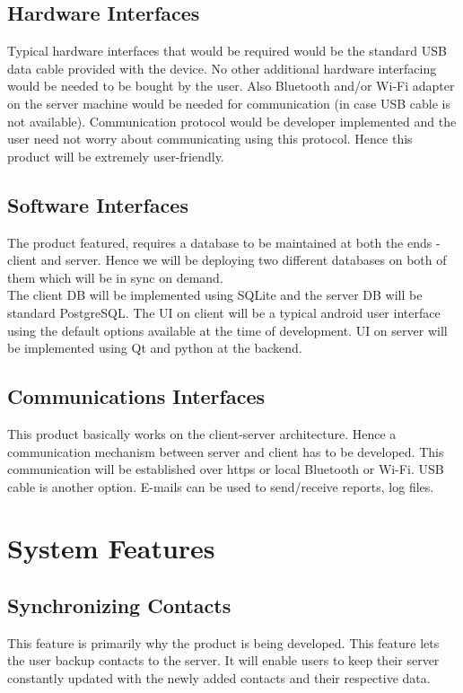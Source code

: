 \subsection{Hardware Interfaces}
\hspace*{0.82cm}Typical hardware interfaces that would be required would be the standard USB data cable
provided with the device. No other additional hardware interfacing would be needed to be bought by
the user. Also Bluetooth and/or Wi-Fi adapter on the server machine would be needed for
communication (in case USB cable is not available). Communication protocol would be developer
implemented and the user need not worry about communicating using this protocol. Hence this
product will be extremely user-friendly.

\subsection{Software Interfaces}
\hspace*{0.82cm}The product featured, requires a database to be maintained at both the ends - client and server.
Hence we will be deploying two different databases on both of them which will be in sync on
demand.\\[0.5cm]
\hspace*{0.82cm}The client DB will be implemented using SQLite and the server DB will be standard
PostgreSQL. The UI on client will be a typical android user interface using the default options
available at the time of development. UI on server will be implemented using Qt and python at the
backend.

\subsection{Communications Interfaces}
\hspace*{0.82cm}This product basically works on the client-server architecture. Hence a communication
mechanism between server and client has to be developed. This communication will be established
over https or local Bluetooth or Wi-Fi. USB cable is another option. E-mails can be used to
send/receive reports, log files.

\section{System Features}
\subsection{Synchronizing Contacts}
\hspace*{0.82cm}This feature is primarily why the product is being developed. This feature lets the user backup
contacts to the server. It will enable users to keep their server constantly updated with the newly
added contacts and their respective data.

